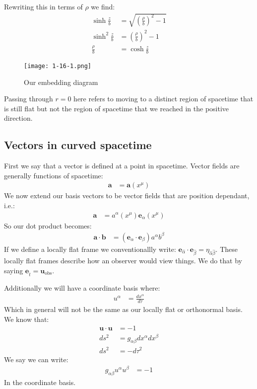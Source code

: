 Rewriting this in terms of $\rho$ we find:
\begin{align*}
	\sinh\frac{z}{b} &= \sqrt{\left(\frac{\rho}{b}\right)^2 - 1} \\
	\sinh^2\frac{z}{b} &= \left(\frac{\rho}{b}\right)^2 - 1 \\
	\frac{\rho}{b} &= \cosh \frac{z}{b}
\end{align*}
\begin{figure*}[h]
	\centering
	\texttt{[image: 1-16-1.png]}
	\caption*{Our embedding diagram}
\end{figure*}
Passing through $r=0$ here refers to moving to a distinct region of spacetime that is still flat but not the region of spacetime that we reached in the positive direction.
\subsection{Vectors in curved spacetime}
First we say that a vector is defined at a point in spacetime. Vector fields are generally functions of spacetime:
\begin{align*}
	\bm{a} &= \bm{a}(x^\mu)
\end{align*}
We now extend our basis vectors to be vector fields that are position dependant, i.e.:
\begin{align*}
	\bm{a} &= a^\alpha(x^\mu) \bm{e}_\alpha(x^\mu)
\end{align*}
So our dot product becomes:
\begin{align*}
	\bm{a}\cdot\bm{b} &= (\bm{e}_\alpha\cdot\bm{e}_\beta)a^\alpha b^\beta
\end{align*}
If we define a locally flat frame we conventionallly write: $\bm{e}_{\hat{\alpha}} \cdot\bm{e}_{\hat{\beta}} = \eta_{\hat{\alpha}\hat{\beta}}$.
These locally flat frames describe how an observer would view things. We do that by saying $\bm{e}_{\hat{t}} = \bm{u}_\text{obs}$.

Additionally we will have a coordinate basis where:
\begin{align*}
	u^\alpha &= \frac{dx^\alpha}{d\tau}
\end{align*}
Which in general will not be the same as our locally flat or orthonormal basis. We know that:
\begin{align*}
	\bm{u}\cdot\bm{u} &= -1 \\
	ds^2 &= g_{\alpha\beta}dx^\alpha dx^\beta \\
	ds^2 &= -d\tau^2
\end{align*}
We say we can write:
\begin{align*}
	g_{\alpha\beta}u^\alpha u^\beta &= -1
\end{align*}
In the coordinate basis.

